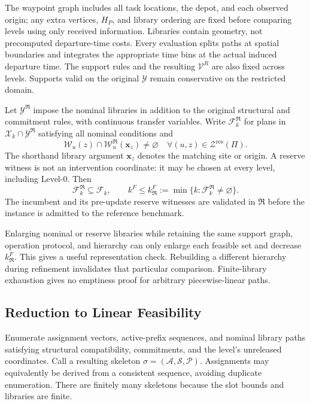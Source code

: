 The waypoint graph includes all task locations, the depot, and each
observed origin; any extra vertices, $H_P$, and library ordering are fixed
before comparing levels using only received information. Libraries contain
geometry, not precomputed departure-time costs. Every evaluation splits
paths at spatial boundaries and integrates the appropriate time bins at
the actual induced departure time. The support rules and the resulting
$\mathcal V^R$ are also fixed across levels. Supports valid on the original
$\mathcal Y$ remain conservative on the restricted domain.

Let $\mathcal Y^{\mathfrak R}$ impose the nominal libraries in addition
to the original structural and commitment rules, with continuous transfer
variables. Write $\mathcal F_k^{\mathfrak R}$ for plans in
$\mathcal X_k\cap\mathcal Y^{\mathfrak R}$ satisfying all nominal
conditions and
\begin{equation}
\mathscr W_u(z)\cap\mathscr W_u^{\mathfrak R}(\mathbf x_z)
\ne\varnothing\quad\forall (u,z)\in\mathcal Z^{\mathrm{res}}(\Pi).
\label{eq:represented_reserve}
\end{equation}
The shorthand library argument $\mathbf x_z$ denotes the matching site or
origin. A reserve witness is not an intervention coordinate: it may be
chosen at every level, including Level-0.
Then
\begin{equation}
\mathcal F_k^{\mathfrak R}\subseteq\mathcal F_k,
\qquad k^F\le k_{\mathfrak R}^F
:=\min\{k:\mathcal F_k^{\mathfrak R}\ne\varnothing\}.
\label{eq:reference_scope_relation}
\end{equation}
The incumbent and its pre-update reserve witnesses are validated in
$\mathfrak R$ before the instance is admitted to the reference benchmark.

Enlarging nominal or reserve libraries while retaining the same support
graph, operation protocol, and hierarchy can only enlarge each feasible
set and decrease $k_{\mathfrak R}^F$. This gives a useful representation
check. Rebuilding a different hierarchy during refinement invalidates that
particular comparison. Finite-library exhaustion gives no emptiness proof
for arbitrary piecewise-linear paths.

\subsection{Reduction to Linear Feasibility}
\label{subsec:linear_reference_search}

Enumerate assignment vectors, active-prefix sequences, and nominal
library paths satisfying structural compatibility, commitments, and the
level's unreleased coordinates. Call a resulting skeleton
$\sigma=(\mathcal A,\mathcal S,\mathcal P)$. Assignments may equivalently
be derived from a consistent sequence, avoiding duplicate enumeration.
There are finitely many skeletons because the slot bounds and libraries
are finite.

